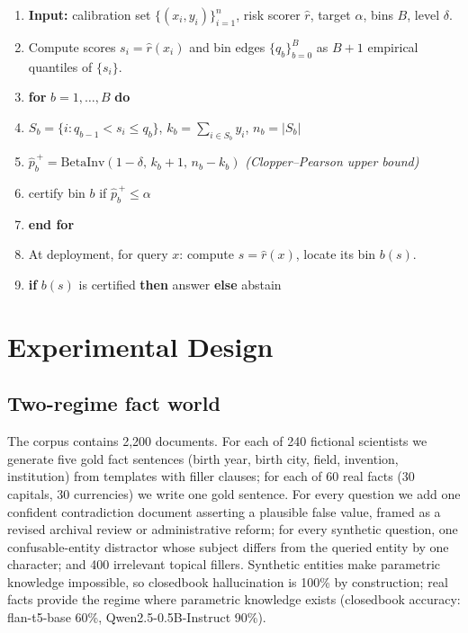 \documentclass[sn-basic]{sn-jnl}
\theoremstyle{thmstyleone}
\theoremstyle{thmstyletwo}
\begin{document}
\begin{algorithm}[ht]
\caption{Risk-binned Mondrian conformal risk control.}
\label{alg:rb}
\begin{enumerate}[label=\arabic*:, leftmargin=2.2em, itemsep=2pt, topsep=2pt]
\item \textbf{Input:} calibration set $\{(x_i, y_i)\}_{i=1}^{n}$, risk scorer
$\hat r$, target $\alpha$, bins $B$, level $\delta$.
\item Compute scores $s_i = \hat r(x_i)$ and bin edges
$\{q_b\}_{b=0}^{B}$ as $B{+}1$ empirical quantiles of $\{s_i\}$.
\item \textbf{for} $b = 1, \dots, B$ \textbf{do}
\item \hspace{1.2em}$S_b = \{i : q_{b-1} < s_i \le q_b\}$,
$k_b = \sum_{i \in S_b} y_i$, $n_b = |S_b|$
\item \hspace{1.2em}$\widehat p^{\,+}_b = \mathrm{BetaInv}(1 - \delta,\, k_b + 1,\, n_b - k_b)$
\hfill\textit{(Clopper--Pearson upper bound)}
\item \hspace{1.2em}certify bin $b$ if $\widehat p^{\,+}_b \le \alpha$
\item \textbf{end for}
\item At deployment, for query $x$: compute $s = \hat r(x)$, locate its
bin $b(s)$.
\item \textbf{if} $b(s)$ is certified \textbf{then} answer \textbf{else} abstain
\end{enumerate}
\end{algorithm}

\section{Experimental Design}\label{sec:design}

\subsection{Two-regime fact world}
The corpus contains 2{,}200 documents. For each of 240 fictional
scientists we generate five gold fact sentences (birth year, birth
city, field, invention, institution) from templates with filler
clauses; for each of 60 real facts (30 capitals, 30 currencies) we
write one gold sentence. For every question we add one confident
contradiction document asserting a plausible false value, framed as a
revised archival review or administrative reform; for every synthetic
question, one confusable-entity distractor whose subject differs from
the queried entity by one character; and 400 irrelevant topical
fillers. Synthetic entities make parametric knowledge impossible, so
closedbook hallucination is 100\% by construction; real facts provide
the regime where parametric knowledge exists (closedbook accuracy:
flan-t5-base 60\%, Qwen2.5-0.5B-Instruct 90\%).
\end{document}
